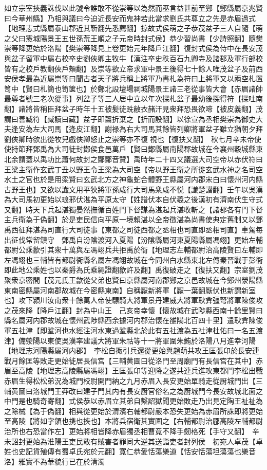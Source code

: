 如立宗室挾義誅伐以此號令誰敢不從崇等以為然而巫言益甚前至鄭【鄭縣屬京兆賢曰今華州縣】乃相與議曰今迫近長安而鬼神若此當求劉氏共尊立之先是赤眉過式【地理志式縣屬泰山郡近其靳翻先悉薦翻】掠故式侯萌之子恭茂盆子三人自隨【萌之父曰憲城陽景王五世孫荒王順之子元帝時封式侯】恭少習尚書【少詩照翻】隨樊崇等降更始於洛陽【樊崇等降見上卷更始元年降戶江翻】復封式侯為侍中在長安茂與盆子留軍中屬右校卒史劉俠卿主牧牛【漢注卒史秩百石九卿寺及諸郡及軍行部校皆有之校戶教翻俠戶頰翻】及崇等欲立帝求軍中景王後得七十餘人唯茂盆子及前西安侯孝最為近屬崇等曰聞古者天子將兵稱上將軍乃書札為符曰上將軍又以兩空札置笥中【賢曰札簡也笥箧也】於鄭北設壇場祠城陽景王諸三老從事皆大會【赤眉諸帥最尊者號三老次從事】列盆子等三人居中立以年次探札盆子最幼後探得符【探吐南翻】諸將皆稱臣拜盆子時年十五被髪徒跣敝衣赭汗見衆拜恐畏欲啼【被皮義翻】茂謂曰善臧符【臧讀曰藏】盆子即齧折棄之【折而設翻】以徐宣為丞相樊崇為御史大夫逢安為左大司馬【逢皮江翻】謝禄為右大司馬其餘皆列卿將軍盆子雖立猶朝夕拜劉俠卿時欲出從牧兒戲俠卿怒止之崇等亦不復視也【復扶又翻】　秋七月辛未帝使使持節拜鄧禹為大司徒封鄼侯食邑萬戶【賢曰鄼縣屬南陽郡故城在今襄州穀城縣東北余謂蓋以禹功比蕭何故封之鄼鄼音贊】禹時年二十四又議選大司空帝以赤伏符曰王梁主衛作玄武丁丑以野王令王梁為大司空【帝以野王衛之所徙玄武水神之名司空水土之官也於是用梁賢曰玄武北方之神龜蛇合體野王縣屬河内郡宋白曰懷州河内縣古野王也】又欲以䜟文用平狄將軍孫咸行大司馬衆咸不悦【䜟楚譛翻】壬午以吳漢為大司馬初更始以琅邪伏湛為平原太守【姓譜伏本自伏羲之後漢初有濟南伏生守式又翻】時天下兵起湛獨晏然撫循百姓門下督謀為湛起兵湛收斬之【諸郡各有門下督主兵衛為于偽翻】於是吏民信向平原一境賴湛以全帝徵湛為尚書使典定舊制又以鄧禹西征拜湛為司直行大司徒事【東都之司徒西都之丞相也司直即丞相司直】車駕每出征伐常留鎮守　鄧禹自汾隂渡河入夏陽【汾隂縣屬河東夏陽縣屬馮翊】更始左輔都尉公乘歙引其衆十萬與左馮翊兵共拒禹於衙【地理志左輔都尉治高陵賢曰左輔即左馮翊也三輔皆有都尉衙縣名屬左馮翊故城在今同州白水縣東北左傳秦晉戰于彭衙即此地公乘姓也以秦爵為氏乘繩證翻歙許及翻】禹復破走之【復扶又翻】宗室劉茂聚衆京密間【茂元氏王歙從父弟也賢曰京縣屬河南郡鄭之京邑故城在今鄭州滎陽縣東南密縣屬河南郡故城在今密縣東南】自稱厭新將軍【厭一葉翻厭伏也新謂新室也】攻下潁川汝南衆十餘萬人帝使驃騎大將軍景丹建威大將軍耿弇彊弩將軍陳俊攻之茂來降【降戶江翻】封為中山王　己亥帝幸懷【懷故城在武陟縣西南十餘里賢曰縣名屬河内郡故城在懷州武陟縣西余據河内郡治懷在雒陽北百四十里】遣耿弇陳俊軍五社津【即鞏河也水經注河水東過鞏縣北於此有五社渡為五社津杜佑曰一名五渡津】備滎陽以東使吳漢率建議大將軍朱祜等十一將軍圍朱鮪於洛陽八月進幸河陽【地理志河陽縣屬河内郡】　李松自掫引兵還從更始與趙萌共攻王匡張卬於長安連戰月餘匡等敗走更始徙居長信宫【三輔黄圖曰從洛門至周廟門有長信宫在其中】赤眉至高陵【地理志高陵縣屬馮翊】王匡張卬等迎降之遂共連兵進攻東都門李松出戰赤眉生得松松弟況為城門校尉開門納之九月赤眉入長安更始單騎走從厨城門出【三輔黄圖曰洛城門王莽改曰建子門其内有長安厨官俗名之為厨城門今長安故城北面之中門是也騎奇寄翻】式侯恭以赤眉立其弟自繫詔獄聞更始敗走乃出見定陶王祉祉為之除械【為于偽翻】相與從更始於渭濱右輔都尉嚴本恐失更始為赤眉所誅即將更始至高陵【將如字領也携也挾也】本將兵宿衛其實圍之【右輔都尉治郿高陵左輔都尉治所也右恐當作左】更始將相皆降赤眉獨丞相曹竟不降手劒格死【手守又翻】　辛未詔封更始為淮陽王吏民敢有賊害者罪同大逆其送詣吏者封列侯　初宛人卓茂【卓姓也史記貨殖傳有蜀卓氏宛於元翻】寛仁恭愛恬蕩樂道【恬安恬蕩坦蕩蕩也樂音洛】雅實不為華貌行已在於清濁